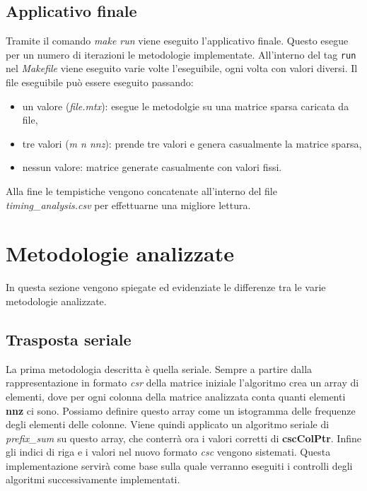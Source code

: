 \documentclass[]{IEEEtran}
\begin{document}
	\subsection{Applicativo finale}
	Tramite il comando \textit{make run} viene eseguito l'applicativo finale. Questo esegue per un numero di iterazioni le metodologie implementate. All'interno del tag \texttt{run} nel \textit{Makefile} viene eseguito varie volte l'eseguibile, ogni volta con valori diversi.\newline
	Il file eseguibile può essere eseguito passando:
	\begin{itemize}
		\item un valore (\textit{file.mtx}): esegue le metodolgie su una matrice sparsa caricata da file,
		\item tre valori (\textit{m n nnz}): prende tre valori e genera casualmente la matrice sparsa,
		\item nessun valore: matrice generate casualmente con valori fissi.
	\end{itemize}
	Alla fine le tempistiche vengono concatenate all'interno del file \textit{timing\_analysis.csv} per effettuarne una migliore lettura.


\section{Metodologie analizzate}
\label{metodologie}
	In questa sezione vengono spiegate ed evidenziate le differenze tra le varie metodologie analizzate. 
		
	\subsection{Trasposta seriale}
	La prima metodologia descritta è quella seriale. Sempre a partire dalla rappresentazione in formato \textit{csr} della matrice iniziale l'algoritmo crea un array di elementi, dove per ogni colonna della matrice analizzata conta quanti elementi \textbf{nnz} ci sono. Possiamo definire questo array come un istogramma delle frequenze degli elementi delle colonne. Viene quindi applicato un algoritmo seriale di \textit{prefix\_sum} su questo array, che conterrà ora i valori corretti di \textbf{cscColPtr}. Infine gli indici di riga e i valori nel nuovo formato \textit{csc} vengono sistemati.\newline
	Questa implementazione servirà come base sulla quale verranno eseguiti i controlli degli algoritmi successivamente implementati.
	
\end{document}
